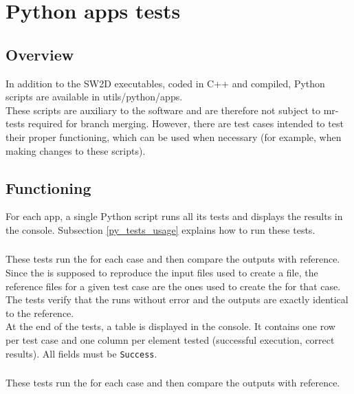 \section{Python apps tests}
\subsection{Overview}
In addition to the SW2D executables, coded in C++ and compiled, Python scripts are available in utils/python/apps. \\
These scripts are auxiliary to the software and are therefore not subject to mr-tests required for branch merging.
However, there are test cases intended to test their proper functioning, which can be used when necessary (for example, when making changes to these scripts).

\subsection{Functioning}

For each app, a single Python script runs all its tests and displays the results in the console.
Subsection \ref{py_tests_usage} explains how to run these tests.

\subsubsection{\swConverterReverse}
These tests run the \swConverterReverse for each case and then compare the outputs with reference.\\

Since the \swConverterReverse is supposed to reproduce the input files used to create a  file, the reference files for a given test case are the ones used to create the  for that case.
The tests verify that the \swConverterReverse runs without error and the outputs are exactly identical to the reference.\\

At the end of the tests, a table is displayed in the console.
It contains one row per test case and one column per element tested (\swConverterReverse successful execution, correct results).
All fields must be \texttt{Success}.

\subsubsection{\swNSPreProcess}
These tests run the \swNSPreProcess for each case and then compare the outputs with reference.\\

